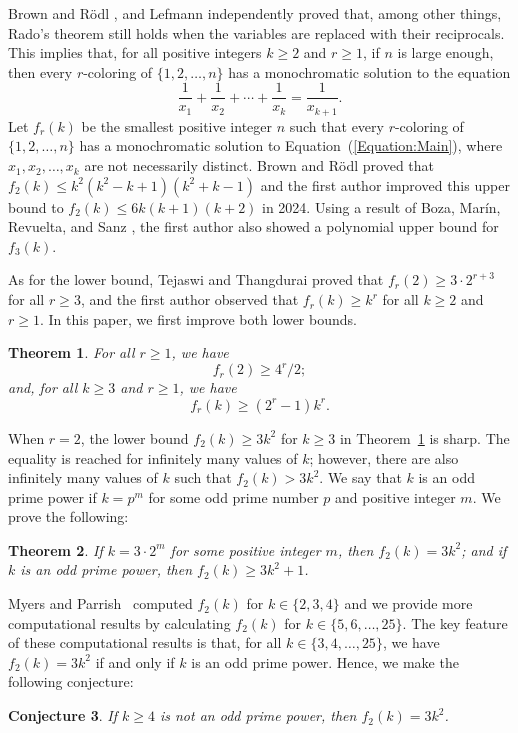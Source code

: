 \documentclass[10pt,a4paper]{amsart}
\newtheorem{theorem}{Theorem}[section]
\newtheorem{conjecture}[theorem]{Conjecture}
\begin{document}
Brown and R\"{o}dl \cite{BrownRodl1991}, and Lefmann \cite{Lefmann1991} independently proved that, among other things, Rado's theorem still holds when the variables are replaced with their reciprocals. This implies that, for all positive integers $k\geq2$ and $r\geq1$, if $n$ is large enough, then every $r$-coloring of $\{1,2,\ldots,n\}$ has a monochromatic solution to the equation
\begin{equation}\label{Equation:Main}
\frac{1}{x_1}+\frac{1}{x_2}+\cdots+\frac{1}{x_k}=\frac{1}{x_{k+1}}.
\end{equation}
Let $f_r(k)$ be the smallest positive integer $n$ such that every $r$-coloring of $\{1,2,\ldots,n\}$ has a monochromatic solution to Equation~(\ref{Equation:Main}), where $x_1,x_2,\ldots,x_k$ are not necessarily distinct. Brown and R\"{o}dl \cite{BrownRodl1991} proved that $f_2(k)\leq k^2(k^2-k+1)(k^2+k-1)$ and the first author \cite{Gaiser2024} improved this upper bound to $f_2(k)\leq6k(k+1)(k+2)$ in 2024. Using a result of Boza, Mar\'{i}n, Revuelta, and Sanz \cite{BMRS2019}, the first author \cite{Gaiser2024} also showed a polynomial upper bound for $f_3(k)$.

As for the lower bound, Tejaswi and Thangdurai \cite{TejaswiThangadurai2002} proved that $f_r(2)\geq3\cdot2^{r+3}$ for all $r\geq3$, and the first author \cite{Gaiser2024} observed that $f_r(k)\geq k^r$ for all $k\geq2$ and $r\geq1$. In this paper, we first improve both lower bounds.
\begin{theorem}\label{Theorem:Main}
For all $r\geq1$, we have
\[
f_r(2)\geq 4^r/2;
\]
and, for all $k\geq3$ and $r\geq1$, we have \[f_r(k)\geq(2^r-1)k^r.\]
\end{theorem}



When $r=2$, the lower bound $f_2(k)\geq3k^2$ for $k\geq3$ in Theorem~\ref{Theorem:Main} is sharp. The equality is reached for infinitely many values of $k$; however, there are also infinitely many values of $k$ such that $f_2(k)>3k^2$. We say that $k$ is an odd prime power if $k=p^m$ for some odd prime number $p$ and positive integer $m$. We prove the following:
\begin{theorem}\label{Theorem:2-ColoringsCombined}
If $k=3\cdot2^m$ for some positive integer $m$, then $f_2(k)=3k^2$; and if $k$ is an odd prime power, then $f_2(k)\geq3k^2+1$.
\end{theorem}

Myers and Parrish~\cite{MyersParrish2018} computed $f_2(k)$ for $k\in\{2,3,4\}$ and we provide more computational results by calculating $f_2(k)$ for $k\in\{5,6,\ldots,25\}$. The key feature of these computational results is that, for all $k\in\{3,4,\ldots,25\}$, we have $f_2(k)=3k^2$ if and only if $k$ is an odd prime power. Hence, we make the following conjecture:
\begin{conjecture}
    If $k\geq4$ is not an odd prime power, then $f_2(k)=3k^2$.
\end{conjecture}
\end{document}

